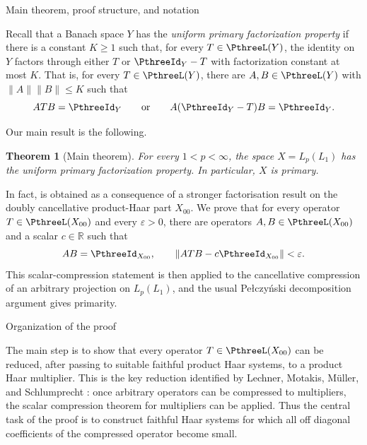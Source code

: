 \documentclass[11pt,reqno]{amsart}
\makeatletter
\theoremstyle{plain}
\newtheorem{theorem}{Theorem}[section]
\theoremstyle{definition}
\newcounter{problempaper}
\newenvironment{problempaperbody}{%
  \setcounter{subsection}{0}%
  \setcounter{subsubsection}{0}%
  \setcounter{paragraph}{0}%
  \renewcommand{\thesubsection}{\arabic{subsection}}%
  \renewcommand{\thesubsubsection}{\thesubsection.\arabic{subsubsection}}%
  \renewcommand{\theparagraph}{\thesubsubsection.\arabic{paragraph}}%
  \let\problem@outersection\section
  \let\problem@outersubsection\subsection
  \let\problem@outersubsubsection\subsubsection
  \let\problem@outerparagraph\paragraph
  \let\section\problem@papersection
  \let\subsection\problem@papersubsection
  \let\subsubsection\problem@papersubsubsection
}{%
  \let\section\problem@outersection
  \let\subsection\problem@outersubsection
  \let\subsubsection\problem@outersubsubsection
  \let\paragraph\problem@outerparagraph
}
\newcommand{\problem@target}[2]{%
  \hypertarget{problem-\theproblempaper-#1-#2}{}%
}
\newcommand{\problem@paperheading}[3]{%
  \par\bigskip
  \problem@target{#1}{#2}%
  \noindent{\large\bfseries #2.\quad #3\par}%
  \nobreak\smallskip
}
\newcommand{\problem@papersubheading}[3]{%
  \par\medskip
  \problem@target{#1}{#2}%
  \noindent{\normalsize\bfseries #2.\quad #3\par}%
  \nobreak\smallskip
}
\newcommand{\problem@papersubsubheading}[3]{%
  \par\smallskip
  \problem@target{#1}{#2}%
  \noindent{\normalsize\itshape #2.\quad #3.\ }%
}
\def\problem@papersection{%
  \@ifstar{\problem@papersectionstar}{\problem@papersectionnostar}%
}
\def\problem@papersectionstar#1{%
  \par\bigskip\noindent{\large\bfseries #1\par}\nobreak\smallskip
}
\def\problem@papersectionnostar#1{%
  \refstepcounter{subsection}%
  \setcounter{subsubsection}{0}%
  \setcounter{paragraph}{0}%
  \problem@paperheading{section}{\thesubsection}{#1}%
  \problem@writecontentsline{section}{\thesubsection}{#1}%
}
\def\problem@papersubsection{%
  \@ifstar{\problem@papersubsectionstar}{\problem@papersubsectionnostar}%
}
\def\problem@papersubsectionstar#1{%
  \par\medskip\noindent{\normalsize\bfseries #1\par}\nobreak\smallskip
}
\def\problem@papersubsectionnostar#1{%
  \refstepcounter{subsubsection}%
  \setcounter{paragraph}{0}%
  \problem@papersubheading{subsection}{\thesubsubsection}{#1}%
  \problem@writecontentsline{subsection}{\thesubsubsection}{#1}%
}
\def\problem@papersubsubsection{%
  \@ifstar{\problem@papersubsubsectionstar}{\problem@papersubsubsectionnostar}%
}
\def\problem@papersubsubsectionstar#1{%
  \par\smallskip\noindent{\normalsize\itshape #1.\ }%
}
\def\problem@papersubsubsectionnostar#1{%
  \refstepcounter{paragraph}%
  \problem@papersubsubheading{subsubsection}{\theparagraph}{#1}%
  \problem@writecontentsline{subsubsection}{\theparagraph}{#1}%
}
\newcommand{\problem@writecontentsline}[3]{%
  \begingroup
  \protected@write\@auxout{}{%
    \string\problemcontentsentry{\theproblempaper}{#1}{#2}{#3}{\thepage}%
  }%
  \endgroup
}
\newcommand{\problemcontentsentry}[5]{%
  \@ifundefined{problemcontents@#1}{%
    \expandafter\gdef\csname problemcontents@#1\endcsname{}%
  }{}%
  \expandafter\g@addto@macro\csname problemcontents@#1\endcsname{%
    \problemcontentsline{#1}{#2}{#3}{#4}{#5}%
  }%
}
\newcommand{\problemcontentslink}[4]{%
  \hyperlink{problem-#1-#2-#3}{#4}%
}
\newcommand{\problemcontentsline}[5]{%
  \ifstrequal{#2}{section}{%
    \par\noindent
    \problemcontentslink{#1}{#2}{#3}{\makebox[2.5em][l]{#3}#4}%
    \nobreak\dotfill
    \problemcontentslink{#1}{#2}{#3}{#5}\par
  }{%
    \ifstrequal{#2}{subsection}{%
      \par\noindent\hspace*{1.5em}%
      \problemcontentslink{#1}{#2}{#3}{\makebox[3.5em][l]{#3}#4}%
      \nobreak\dotfill
      \problemcontentslink{#1}{#2}{#3}{#5}\par
    }{%
      \par\noindent\hspace*{3em}%
      \problemcontentslink{#1}{#2}{#3}{\makebox[4.5em][l]{#3}#4}%
      \nobreak\dotfill
      \problemcontentslink{#1}{#2}{#3}{#5}\par
    }%
  }%
}
\makeatother
\begin{document}
\begin{problempaperbody}

\section{Main theorem, proof structure, and notation}
\label{p3:sec:statement}

Recall that a Banach space $Y$ has the \emph{uniform primary factorization property} if there is a constant $K\geq1$ such that, for every $T\in\PthreeL(Y)$, the identity on $Y$ factors through either $T$ or $\PthreeId_Y-T$ with factorization constant at most $K$. That is, for every $T\in\PthreeL(Y)$, there are $A,B\in\PthreeL(Y)$ with $\|A\|\|B\|\leq K$ such that
\begin{equation*}
        ATB=\PthreeId_Y
        \qquad\text{or}\qquad
        A(\PthreeId_Y-T)B=\PthreeId_Y.
\end{equation*}

Our main result is the following.

\begin{theorem}[Main theorem]
\label{p3:thm:main}
For every $1<p<\infty$, the space $X=L_p(L_1)$ has the uniform primary factorization property. In particular, $X$ is primary.
\end{theorem}

In fact,  is obtained as a consequence of a stronger factorisation result on the doubly cancellative product-Haar part $X_{00}$. We prove that for every operator $T\in\PthreeL(X_{00})$ and every $\varepsilon>0$, there are operators $A,B\in\PthreeL(X_{00})$ and a scalar $c\in\mathbb R$ such that
\begin{equation*}
        AB=\PthreeId_{X_{00}},
        \qquad
        \|ATB-c\PthreeId_{X_{00}}\|<\varepsilon .
\end{equation*}
This scalar-compression statement is then applied to the cancellative compression of an arbitrary projection on $L_p(L_1)$, and the usual Pe{\l}czy\'nski decomposition argument gives primarity.

\subsection{Organization of the proof}
\label{p3:sec:proof-organization}

The main step is to show that every operator $T\in\PthreeL(X_{00})$ can be reduced, after passing to suitable faithful product Haar systems, to a product Haar multiplier. This is the key reduction identified by Lechner, Motakis, M\"uller, and Schlumprecht \cite{LechnerMotakisMullerSchlumprecht2024}: once arbitrary operators can be compressed to multipliers, the scalar compression theorem for multipliers can be applied. Thus the central task of the proof is to construct faithful Haar systems for which all off diagonal coefficients of the compressed operator become small.


\end{problempaperbody}
\end{document}
